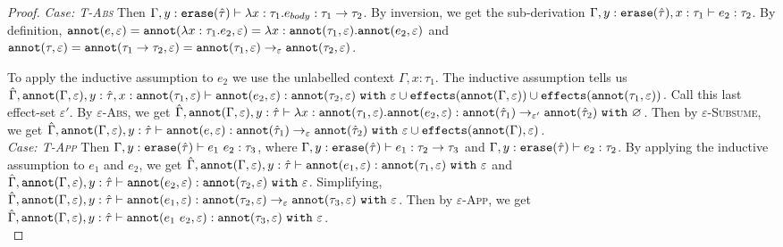 \begin{appendix}
\begin{proof}
\textit{Case: \textsc{T-Abs}} Then $\Gamma, y: \mathtt{erase}(\hat \tau) \vdash \lambda x: \tau_1.e_{body} : \tau_1 \rightarrow \tau_2$. By inversion, we get the sub-derivation $\Gamma, y: \mathtt{erase}(\hat \tau), x:\tau_1  \vdash e_2: \tau_2$. By definition, $\mathtt{annot}(e, \varepsilon) = \mathtt{annot}(\lambda x: \tau_1.e_2, \varepsilon) = \lambda x: \mathtt{annot}(\tau_1, \varepsilon).\mathtt{annot}(e_2, \varepsilon)$ and $\mathtt{annot}(\tau, \varepsilon) = \mathtt{annot}(\tau_1 \rightarrow \tau_2, \varepsilon) = \mathtt{annot}(\tau_1, \varepsilon) \rightarrow_{\varepsilon} \mathtt{annot}(\tau_2, \varepsilon)$. 

To apply the inductive assumption to $e_2$ we use the unlabelled context $\Gamma, x: \tau_1$. The inductive assumption tells us $\hat \Gamma, \mathtt{annot}(\Gamma, \varepsilon), y: \hat \tau, x: \mathtt{annot}(\tau_1, \varepsilon) \vdash \mathtt{annot}(e_2, \varepsilon): \mathtt{annot}(\tau_2, \varepsilon)~\mathtt{with}~ \varepsilon \cup \mathtt{effects}(\mathtt{annot}(\Gamma, \varepsilon)) \cup \mathtt{effects}(\mathtt{annot}(\tau_1, \varepsilon))$. Call this last effect-set $\varepsilon'$. By \textsc{$\varepsilon$-Abs}, we get $\hat \Gamma, \mathtt{annot}(\Gamma, \varepsilon), y: \hat \tau \vdash \lambda x: \mathtt{annot}(\tau_1, \varepsilon) . \mathtt{annot}(e_2, \varepsilon) : \mathtt{annot}(\hat \tau_1) \rightarrow_{\varepsilon'} \mathtt{annot}(\hat \tau_2)~\mathtt{with}~ \varnothing$. Then by \textsc{$\varepsilon$-Subsume}, we get $\hat \Gamma, \mathtt{annot}(\Gamma, \varepsilon), y: \hat \tau \vdash \mathtt{annot}(e, \varepsilon) : \mathtt{annot}(\hat \tau_1) \rightarrow_{\varepsilon} \mathtt{annot}(\hat \tau_2)~\mathtt{with}~ \varepsilon \cup \mathtt{effects}(\mathtt{annot}(\Gamma), \varepsilon) $.\\

\textit{Case: \textsc{T-App}} Then $\Gamma, y: \mathtt{erase}(\hat \tau) \vdash e_1~e_2: \tau_3$, where $\Gamma, y:\mathtt{erase}(\hat \tau) \vdash e_1: \tau_2 \rightarrow \tau_3$ and $\Gamma, y: \mathtt{erase}(\hat \tau) \vdash e_2: \tau_2$. By applying the inductive assumption to $e_1$ and $e_2$, we get $\hat \Gamma, \mathtt{annot}(\Gamma, \varepsilon), y: \hat \tau \vdash \mathtt{annot}(e_1, \varepsilon): \mathtt{annot}(\tau_1, \varepsilon)~\mathtt{with}~ \varepsilon$ and $\hat \Gamma, \mathtt{annot}(\Gamma, \varepsilon), y: \hat \tau \vdash \mathtt{annot}(e_2, \varepsilon): \mathtt{annot}(\tau_2, \varepsilon)~\mathtt{with}~ \varepsilon$. Simplifying, $\hat \Gamma, \mathtt{annot}(\Gamma, \varepsilon), y: \hat \tau \vdash \mathtt{annot}(e_1, \varepsilon): \mathtt{annot}(\tau_2, \varepsilon) \rightarrow_{\varepsilon} \mathtt{annot}(\tau_3, \varepsilon)~\mathtt{with}~ \varepsilon$. Then by \textsc{$\varepsilon$-App}, we get $\hat \Gamma, \mathtt{annot}(\Gamma, \varepsilon), y: \hat \tau \vdash \mathtt{annot}(e_1~e_2, \varepsilon):  \mathtt{annot}(\tau_3, \varepsilon)~\mathtt{with}~ \varepsilon$.
\\


\end{proof}
\end{appendix}
